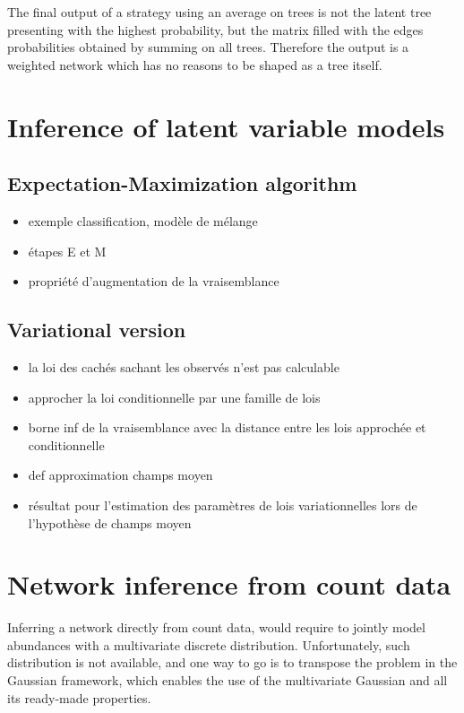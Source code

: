 The final output of a strategy using an average on trees is not the latent tree presenting with the highest probability, but the matrix filled with the edges probabilities obtained by summing on all trees. Therefore the output is a weighted network which has no reasons to be shaped as a tree itself.

\section{Inference of latent variable models}

 \subsection{Expectation-Maximization algorithm}
\begin{itemize}
\item exemple  classification, modèle de mélange
\item étapes E et M
\item propriété d'augmentation de la vraisemblance
\end{itemize}
 \subsection{Variational version}
 \begin{itemize}
 \item  la loi des cachés sachant les observés n'est pas calculable
 \item approcher la loi conditionnelle par une famille de lois
 \item borne inf de la vraisemblance avec la distance entre les lois approchée et conditionnelle
 \item def approximation champs moyen
 \item résultat pour l'estimation des paramètres de lois variationnelles lors de l'hypothèse de champs moyen
 \end{itemize}
 
\section{Network inference from count data}
  Inferring a network directly from count data, would require to jointly model abundances with a multivariate discrete distribution. Unfortunately, such distribution is not available, and one way to go is to transpose the problem in the Gaussian framework, which enables the use of the multivariate Gaussian and all its ready-made properties.
  
